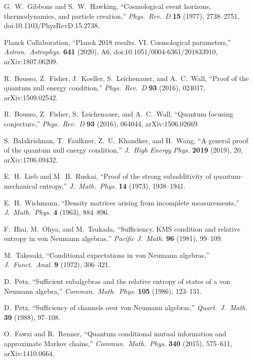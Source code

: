 G.~W.~Gibbons and S.~W.~Hawking,
``Cosmological event horizons, thermodynamics, and particle creation,''
\emph{Phys.\ Rev.\ D} \textbf{15} (1977), 2738--2751,
doi:10.1103/PhysRevD.15.2738.

Planck Collaboration,
``Planck 2018 results. VI. Cosmological parameters,''
\emph{Astron.\ Astrophys.} \textbf{641} (2020), A6,
doi:10.1051/0004-6361/201833910,
arXiv:1807.06209.

R.~Bousso, Z.~Fisher, J.~Koeller, S.~Leichenauer, and A.~C.~Wall,
``Proof of the quantum null energy condition,''
\emph{Phys.\ Rev.\ D} \textbf{93} (2016), 024017,
arXiv:1509.02542.

R.~Bousso, Z.~Fisher, S.~Leichenauer, and A.~C.~Wall,
``Quantum focusing conjecture,''
\emph{Phys.\ Rev.\ D} \textbf{93} (2016), 064044,
arXiv:1506.02669.

S.~Balakrishnan, T.~Faulkner, Z.~U.~Khandker, and H.~Wang,
``A general proof of the quantum null energy condition,''
\emph{J.\ High Energy Phys.} \textbf{2019} (2019), 20,
arXiv:1706.09432.

E.~H.~Lieb and M.~B.~Ruskai,
``Proof of the strong subadditivity of quantum-mechanical entropy,''
\emph{J.\ Math.\ Phys.} \textbf{14} (1973), 1938--1941.

E.~H.~Wichmann,
``Density matrices arising from incomplete measurements,''
\emph{J.\ Math.\ Phys.} \textbf{4} (1963), 884--896.

F.~Hiai, M.~Ohya, and M.~Tsukada,
``Sufficiency, KMS condition and relative entropy in von Neumann algebras,''
\emph{Pacific J.\ Math.} \textbf{96} (1981), 99--109.

M.~Takesaki,
``Conditional expectations in von Neumann algebras,''
\emph{J.\ Funct.\ Anal.} \textbf{9} (1972), 306--321.

D.~Petz,
``Sufficient subalgebras and the relative entropy of states of a von Neumann algebra,''
\emph{Commun.\ Math.\ Phys.} \textbf{105} (1986), 123--131.

D.~Petz,
``Sufficiency of channels over von Neumann algebras,''
\emph{Quart.\ J.\ Math.} \textbf{39} (1988), 97--108.

O.~Fawzi and R.~Renner,
``Quantum conditional mutual information and approximate Markov chains,''
\emph{Commun.\ Math.\ Phys.} \textbf{340} (2015), 575--611,
arXiv:1410.0664.

